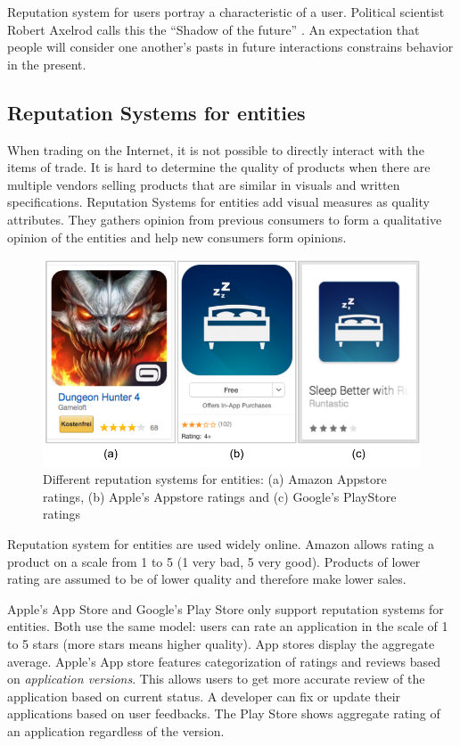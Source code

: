 Reputation system for users portray a characteristic of a user. Political scientist Robert Axelrod calls this the ``Shadow of the future'' \cite{Axelrod1984}. An expectation that people will consider one another's pasts in future interactions constrains behavior in the present.

\subsection{Reputation Systems for entities}

When trading on the Internet, it is not possible to directly interact with the items of trade. It is hard to determine the quality of products when there are multiple vendors selling products that are similar in visuals and written specifications. Reputation Systems for entities add visual measures as quality attributes. They gathers opinion from previous consumers to form a qualitative opinion of the entities and help new consumers form opinions.

\begin{figure}[!htb]
  \centering
  \includegraphics[width=12cm]{figures/rs_for_entities.pdf} 
  \caption{Different reputation systems for entities: (a) Amazon Appstore ratings, (b) Apple's Appstore ratings and (c) Google's PlayStore ratings}
  \label{fig:rs_for_entities}
\end{figure}

Reputation system for entities are used widely online. Amazon allows rating a product on a scale from 1 to 5 (1 very bad, 5 very good). Products of lower rating are assumed to be of lower quality and therefore make lower sales.

Apple's App Store and Google's Play Store only support reputation systems for entities. Both use the same model: users can rate an application in the scale of 1 to 5 stars (more stars means higher quality). App stores display the aggregate average. Apple's App store features categorization of ratings and reviews based on \emph{application versions}. This allows users to get more accurate review of the application based on current status. A developer can fix or update their applications based on user feedbacks. The Play Store shows aggregate rating of an application regardless of the version.

